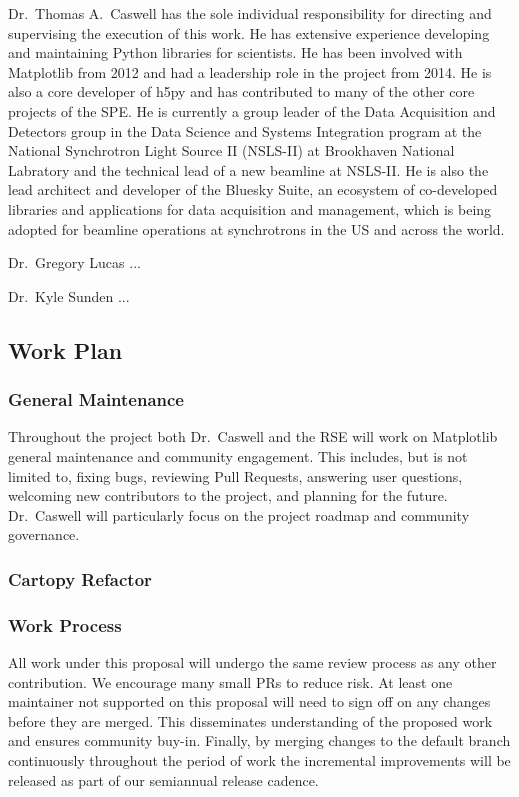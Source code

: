 \documentclass[12pt]{article}
\numberwithin{page}{section}
\begin{document}
Dr.\ Thomas A.\ Caswell has the sole individual responsibility for directing
and supervising the execution of this work.  He has extensive experience
developing and maintaining Python libraries for scientists.  He has been
involved with Matplotlib from 2012 and had a leadership role in the project
from 2014.  He is also a core developer of h5py and has contributed to many of
the other core projects of the SPE.  He is currently a group leader of the Data
Acquisition and Detectors group in the Data Science and Systems Integration
program at the National Synchrotron Light Source II (NSLS-II) at Brookhaven
National Labratory and the technical lead of a new beamline at NSLS-II.  He is
also the lead architect and developer of the Bluesky Suite, an ecosystem of
co-developed libraries and applications for data acquisition and management,
which is being adopted for beamline operations at synchrotrons in the US and
across the world.

Dr.\ Gregory Lucas ...

Dr.\ Kyle Sunden ...


\subsection{Work Plan}


\subsubsection{General Maintenance}

Throughout the project both Dr.\ Caswell and the RSE will work on
Matplotlib general maintenance and community engagement.  This includes,
but is not limited to, fixing bugs, reviewing Pull Requests, answering
user questions, welcoming new contributors to the project, and
planning for the future.  Dr.\ Caswell will particularly focus on
the project roadmap and community governance.

\subsubsection{Cartopy Refactor}

\subsubsection{Work Process}

All work under this proposal will undergo the same review process
as any other contribution.  We
encourage many small PRs to reduce risk.  At least one maintainer not
supported on this proposal
will need to sign off on any changes before they are merged. This
disseminates understanding of the proposed work and ensures
community buy-in.  Finally, by merging
changes to the default branch continuously throughout the period of
work the incremental improvements will be released as part of our
semiannual release cadence.
\end{document}
